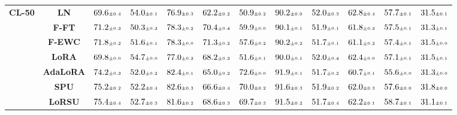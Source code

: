 \begin{table}
\begin{center}
\begin{small}
\begin{tabular}{l c c c c c c c c c c c}
\midrule
\multirow{7}{*}{\textbf{CL-50}} & \textbf{LN} & $69.6 \mtiny{\pm 0.4}$ & $54.0 \mtiny{\pm 0.1}$ & $76.9 \mtiny{\pm 0.3}$ & $62.2 \mtiny{\pm 0.2}$ & $50.9 \mtiny{\pm 0.2}$ & $90.2 \mtiny{\pm 0.0}$ & $52.0 \mtiny{\pm 0.3}$ & $62.8 \mtiny{\pm 0.4}$ & $57.7 \mtiny{\pm 0.1}$ & $31.5 \mtiny{\pm 0.1}$ \\
& \textbf{F-FT} & $71.2 \mtiny{\pm 0.3}$ & $50.3 \mtiny{\pm 0.3}$ & $78.3 \mtiny{\pm 0.2}$ & $70.4 \mtiny{\pm 0.4}$ & $59.9 \mtiny{\pm 0.0}$ & $90.1 \mtiny{\pm 0.1}$ & $51.9 \mtiny{\pm 0.1}$ & $61.8 \mtiny{\pm 0.3}$ & $57.5 \mtiny{\pm 0.1}$ & $31.3 \mtiny{\pm 0.1}$ \\
& \textbf{F-EWC} & $71.8 \mtiny{\pm 0.2}$ & $51.6 \mtiny{\pm 0.1}$ & $78.3 \mtiny{\pm 0.0}$ & $71.3 \mtiny{\pm 0.2}$ & $57.6 \mtiny{\pm 0.2}$ & $90.2 \mtiny{\pm 0.2}$ & $51.7 \mtiny{\pm 0.1}$ & $61.1 \mtiny{\pm 0.2}$ & $57.4 \mtiny{\pm 0.1}$ & $31.5 \mtiny{\pm 0.0}$ \\
& \textbf{LoRA} & $69.8 \mtiny{\pm 0.0}$ & $54.7 \mtiny{\pm 0.0}$ & $77.0 \mtiny{\pm 0.3}$ & $68.2 \mtiny{\pm 0.3}$ & $51.6 \mtiny{\pm 0.1}$ & $90.0 \mtiny{\pm 0.1}$ & $52.0 \mtiny{\pm 0.4}$ & $62.4 \mtiny{\pm 0.0}$ & $57.1 \mtiny{\pm 0.1}$ & $31.5 \mtiny{\pm 0.1}$ \\
& \textbf{AdaLoRA} & $74.2 \mtiny{\pm 0.3}$ & $52.0 \mtiny{\pm 0.2}$ & $82.4 \mtiny{\pm 0.1}$ & $65.0 \mtiny{\pm 0.2}$ & $72.6 \mtiny{\pm 0.0}$ & $91.9 \mtiny{\pm 0.1}$ & $51.7 \mtiny{\pm 0.2}$ & $60.7 \mtiny{\pm 0.1}$ & $55.6 \mtiny{\pm 0.0}$ & $31.3 \mtiny{\pm 0.0}$ \\
& \textbf{SPU} & $75.2 \mtiny{\pm 0.2}$ & $52.2 \mtiny{\pm 0.4}$ & $82.6 \mtiny{\pm 0.3}$ & $66.6 \mtiny{\pm 0.4}$ & $70.0 \mtiny{\pm 0.2}$ & $91.6 \mtiny{\pm 0.3}$ & $51.9 \mtiny{\pm 0.2}$ & $62.0 \mtiny{\pm 0.3}$ & $57.6 \mtiny{\pm 0.0}$ & $31.8 \mtiny{\pm 0.0}$ \\
& \textbf{LoRSU} & $75.4 \mtiny{\pm 0.4}$ & $52.7 \mtiny{\pm 0.3}$ & $81.6 \mtiny{\pm 0.2}$ & $68.6 \mtiny{\pm 0.3}$ & $69.7 \mtiny{\pm 0.3}$ & $91.5 \mtiny{\pm 0.2}$ & $51.7 \mtiny{\pm 0.4}$ & $62.2 \mtiny{\pm 0.1}$ & $58.7 \mtiny{\pm 0.1}$ & $31.1 \mtiny{\pm 0.1}$ \\
\bottomrule
\end{tabular}
\endgroup
\end{small}
\end{center}
\vskip -0.1in
\end{table}


